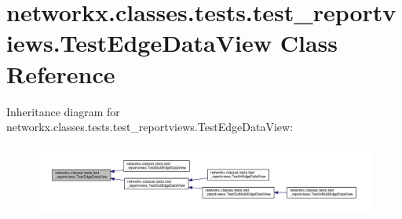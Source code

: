 \hypertarget{classnetworkx_1_1classes_1_1tests_1_1test__reportviews_1_1TestEdgeDataView}{}\section{networkx.\+classes.\+tests.\+test\+\_\+reportviews.\+Test\+Edge\+Data\+View Class Reference}
\label{classnetworkx_1_1classes_1_1tests_1_1test__reportviews_1_1TestEdgeDataView}


Inheritance diagram for networkx.\+classes.\+tests.\+test\+\_\+reportviews.\+Test\+Edge\+Data\+View\+:
\nopagebreak
\begin{figure}[H]
\begin{center}
\leavevmode
\includegraphics[width=350pt]{classnetworkx_1_1classes_1_1tests_1_1test__reportviews_1_1TestEdgeDataView__inherit__graph}
\end{center}
\end{figure}
